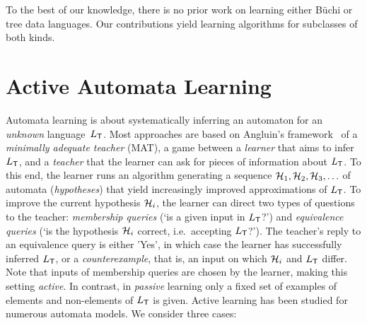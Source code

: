 \documentclass[a4paper,UKenglish,cleveref,autoref,thm-restate,numberwithinsect,final]{lipics-v2021}
\begin{document}
To the best of our knowledge, there is no prior work on learning either Büchi or tree data
languages. Our contributions yield learning algorithms for subclasses of both kinds.

 \section{Active Automata Learning}\label{sec:active-learning} Automata learning is about systematically inferring an automaton for an
    \emph{unknown} language~$L_\textsf{T}$. Most approaches are based on Angluin's framework~\cite{angluin87} of a \emph{minimally adequate teacher} (MAT), a game between a \emph{learner} that aims to infer $L_\textsf{T}$, and a \emph{teacher} that the learner can ask for pieces of information about $L_\textsf{T}$. To this end, the learner runs an algorithm generating a sequence $\mathcal{H}_1,\mathcal{H}_2,\mathcal{H}_3,\ldots$ of automata (\emph{hypotheses}) that yield increasingly improved approximations of $L_\textsf{T}$. To improve the current hypothesis $\mathcal{H}_i$, the learner can direct two types of questions to the teacher: \emph{membership queries} (`is a given input in $L_\textsf{T}$?') and \emph{equivalence queries} (`is the hypothesis $\mathcal{H}_i$ correct, i.e.~accepting $L_\textsf{T}$?'). The teacher's reply to an equivalence query is either 'Yes', in which case the learner has successfully inferred $L_\textsf{T}$, or a \emph{counterexample}, that is, an input on which $\mathcal{H}_i$ and $L_\textsf{T}$ differ. Note that inputs of membership queries are chosen by the learner, making this setting \emph{active}. In contrast, in \emph{passive} learning only a fixed set of  examples of elements and non-elements of $L_\textsf{T}$ is given. Active learning has been studied for numerous automata models. We consider three cases:
\end{document}

